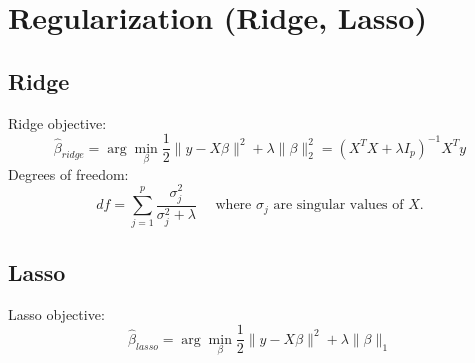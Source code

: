 \documentclass{article}
\begin{document}
\section{Regularization (Ridge, Lasso)}
\subsection{Ridge}
Ridge objective:
$$\hat \beta_{ridge} = \arg \min _\beta \frac{1}{2} \|y - X\beta\|^2 + \lambda \|\beta\|_2^2 = (X^TX + \lambda I_p )^{-1}X^T y $$
Degrees of freedom:
$$df = \sum_{j=1}^p \frac{\sigma^2_j}{\sigma^2_j + \lambda} \quad \text{ where } \sigma_j \text{ are singular values of } X.$$  
\subsection{Lasso}

Lasso objective: 
$$\hat \beta_{lasso} = \arg \min _\beta \frac{1}{2} \|y - X\beta\|^2 + \lambda \|\beta\|_1$$ 
\end{document}
